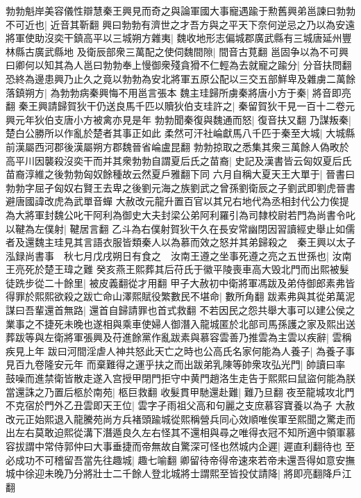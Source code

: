 勃勃魁岸美容儀性辯慧秦王興見而奇之與論軍國大事寵遇踰于勲舊興弟邕諫曰勃勃不可近也|{
	近音其靳翻}
興曰勃勃有濟世之才吾方與之平天下奈何逆忌之乃以為安遠將軍使助沒奕干鎮高平以三城朔方雜夷|{
	魏收地形志偏城郡廣武縣有三城唐延州豐林縣古廣武縣地}
及衛辰部衆三萬配之使伺魏間隙|{
	間音古莧翻}
邕固争以為不可興曰卿何以知其為人邕曰勃勃奉上慢御衆殘貪猾不仁輕為去就寵之踰分|{
	分音扶問翻}
恐終為邊患興乃止久之竟以勃勃為安北將軍五原公配以三交五部鮮卑及雜虜二萬餘落鎮朔方|{
	為勃勃病秦興悔不用邕言張本}
魏主珪歸所虜秦將唐小方于秦|{
	將音即亮翻}
秦王興請歸賀狄干仍送良馬千匹以贖狄伯支珪許之|{
	秦留賀狄干見一百十二卷元興元年狄伯支唐小方被禽亦見是年}
勃勃聞秦復與魏通而怒|{
	復音扶又翻}
乃謀叛秦|{
	楚白公勝所以作亂於楚者其事正如此}
柔然可汗社崘獻馬八千匹于秦至大城|{
	大城縣前漢屬西河郡後漢屬朔方郡魏晉省崘盧昆翻}
勃勃掠取之悉集其衆三萬餘人偽畋於高平川因襲殺沒奕干而并其衆勃勃自謂夏后氏之苗裔|{
	史記及漢書皆云匈奴夏后氏苗裔淳維之後勃勃匈奴餘種故云然夏戶雅翻下同}
六月自稱大夏天王大單于|{
	晉書曰勃勃字屈孑匈奴右賢王去卑之後劉元海之族劉武之曾孫劉衛辰之子劉武即劉虎晉書避唐國諱改虎為武單音蟬}
大赦改元龍升置百官以其兄右地代為丞相封代公力俟提為大將軍封魏公叱干阿利為御史大夫封梁公弟阿利羅引為司隸校尉若門為尚書令叱以鞬為左僕射|{
	鞬居言翻}
乙斗為右僕射賀狄干久在長安常幽閉因習讀經史舉止如儒者及還魏主珪見其言語衣服皆類秦人以為慕而效之怒并其弟歸殺之　秦王興以太子泓録尚書事　秋七月戊戌朔日有食之　汝南王遵之坐事死遵之亮之五世孫也|{
	汝南王亮死於楚王瑋之難}
癸亥燕王熙葬其后苻氏于徽平陵喪車高大毁北門而出熙被髮徒跣步從二十餘里|{
	被皮義翻從才用翻}
甲子大赦初中衛將軍馮跋及弟侍御郎素弗皆得罪於熙熙欲殺之跋亡命山澤熙賦役繁數民不堪命|{
	數所角翻}
跋素弗與其從弟萬泥謀曰吾輩還首無路|{
	還首自歸請罪也首式救翻}
不若因民之怨共舉大事可以建公侯之業事之不捷死未晚也遂相與乘車使婦人御潛入龍城匿於北部司馬孫護之家及熙出送葬跋等與左衛將軍張興及苻進餘黨作亂跋素與慕容雲善乃推雲為主雲以疾辭|{
	雲稱疾見上年}
跋曰河間淫虐人神共怒此天亡之時也公高氏名家何能為人養子|{
	為養子事見百九卷隆安元年}
而棄難得之運乎扶之而出跋弟乳陳等帥衆攻弘光門|{
	帥讀曰率}
鼓噪而進禁衛皆散走遂入宫授甲閉門拒守中黄門趙洛生走告于熙熙曰鼠盜何能為朕當還誅之乃置后柩於南苑|{
	柩巨救翻}
收髮貫甲馳還赴難|{
	難乃旦翻}
夜至龍城攻北門不克宿於門外乙丑雲即天王位|{
	雲字子雨祖父高和句麗之支庶慕容寶養以為子}
大赦改元正始熙退入龍騰苑尚方兵褚頭踰城從熙稱營兵同心效順唯俟軍至熙聞之驚走而出左右莫敢迫熙從溝下潛遁良久左右怪其不還相與尋之唯得衣冠不知所適中領軍慕容拔謂中常侍郭仲曰大事垂捷而帝無故自驚深可怪也然城内企遲|{
	遲直利翻待也}
至必成功不可稽留吾當先往趣城|{
	趣七喻翻}
卿留待帝得帝速來若帝未還吾得如意安撫城中徐迎未晚乃分將壯士二千餘人登北城將士謂熙至皆投仗請降|{
	將即亮翻降戶江翻}
